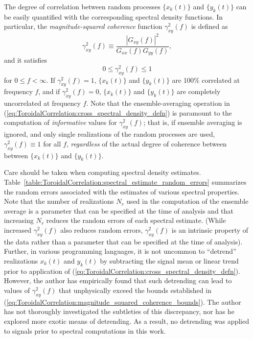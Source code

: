 The degree of correlation between random processes
$\{x_k(t)\}$ and $\{y_k(t)\}$ can be easily quantified
with the corresponding spectral density functions.
In particular, the \emph{magnitude-squared coherence} function
$\gamma_{xy}^2(f)$ is defined as
\begin{equation}
  \gamma_{xy}^2(f)
  \equiv
  \frac{|G_{xy}(f)|^2}{G_{xx}(f) G_{yy}(f)},
  \label{eq:ToroidalCorrelation:magnitude_squared_coherence_defn}
\end{equation}
and it satisfies
\begin{equation}
  0 \leq \gamma_{xy}^2(f) \leq 1
  \label{eq:ToroidalCorrelation:magnitude_squared_coherence_bounds}
\end{equation}
for $0 \leq f < \infty$.
If $\gamma_{xy}^2(f) = 1$,
$\{x_k(t)\}$ and $\{y_k(t)\}$ are 100\% correlated at frequency $f$, and
if $\gamma_{xy}^2(f) = 0$,
$\{x_k(t)\}$ and $\{y_k(t)\}$ are completely uncorrelated at frequency $f$.
Note that the ensemble-averaging operation in
(\ref{eq:ToroidalCorrelation:cross_spectral_density_defn})
is paramount to the computation
of \emph{informative} values for $\gamma_{xy}^2(f)$;
that is, if ensemble averaging is ignored, and
only single realizations of the random processes are used,
$\gamma_{xy}^2(f) \equiv 1$ for all $f$,
\emph{regardless} of the actual degree of coherence
between between $\{x_k(t)\}$ and $\{y_k(t)\}$.

Care should be taken when computing spectral density estimates.
Table~\ref{table:ToroidalCorrelation:spectral_estimate_random_errors}
summarizes the random errors associated with the estimates
of various spectral properties.
Note that the number of realizations $N_r$ used
in the computation of the ensemble average
is a parameter that can be specified
at the time of analysis and that
increasing $N_r$ reduces the random errors of each spectral estimate.
(While increased $\gamma_{xy}^2(f)$ also reduces random errors,
$\gamma_{xy}^2(f)$ is an intrinsic property of the data
rather than a parameter that can be specified at the time of analysis).
Further, in various programming languages,
it is not uncommon to ``detrend'' realizations $x_k(t)$ and $y_k(t)$
by subtracting the signal mean or linear trend
prior to application of
(\ref{eq:ToroidalCorrelation:cross_spectral_density_defn}).
However, the author has empirically found that
such detrending can lead to values of $\gamma_{xy}^2(f)$
that unphysically exceed the bounds established in
(\ref{eq:ToroidalCorrelation:magnitude_squared_coherence_bounds}).
The author has not thoroughly investigated the subtleties of this discrepancy,
nor has he explored more exotic means of detrending.
As a result, no detrending was applied to signals
prior to spectral computations in this work.

